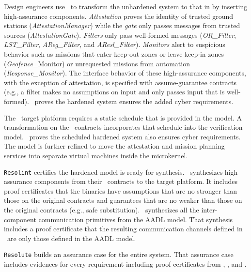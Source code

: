 Design engineers use \briefcase\ to transform the unhardened system to that in  by inserting high-assurance components. 
\emph{Attestation} proves the identity of trusted ground stations (\emph{AttestationManager}) while the \emph{gate} only passes messages from trusted sources (\emph{AttestationGate}).
\emph{Filters} only pass well-formed messages (\emph{OR\_Filter}, \emph{LST\_Filter}, \emph{AReg\_Filter}, and \emph{AResl\_Filter}).
\emph{Monitors} alert to suspicious behavior such as missions that enter keep-out zones or leave keep-in zones (\emph{Geofence}\_Monitor) or unrequested missions from automation (\emph{Response\_Monitor}).
The interface behavior of these high-assurance components, with the exception of attestation, is specified with assume-guarantee contracts (e.g., a filter makes no assumptions on input and only passes input that is well-formed).
\agree\ proves the hardened system ensures the added cyber requirements.

The \selFour\ target platform requires a static schedule that is provided in the model.
A transformation on the \agree\ contracts incorporates that schedule into the verification model.
\agree\ proves the scheduled hardened system also ensures cyber requirements.
The model is further refined to move the attestation and mission planning services into separate virtual machines inside the microkernel.

\texttt{Resolint} certifies the hardened model is ready for synthesis.
\splat\ synthesizes high-assurance components from their \agree\ contracts to the target platform.
It includes proof certificates that the binaries have assumptions that are no stronger than those on the original contracts and guarantees that are no weaker than those on the original contracts (e.g., safe substitution).
\hamr\ synthesizes all the inter-component communication primitives from the AADL model.
That synthesis includes a proof certificate that the resulting communication channels defined in \selFour\ are only those defined in the AADL model.

\texttt{Resolute} builds an assurance case for the entire system.
That assurance case includes evidences for every requirement including proof certificates from \agree, \splat, and \hamr.
